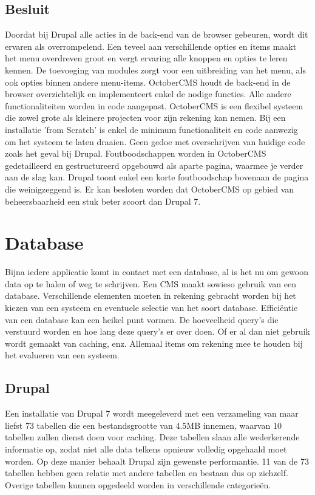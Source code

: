 \subsection{Besluit}
Doordat bij Drupal alle acties in de back-end van de browser gebeuren, wordt dit ervaren als overrompelend. Een teveel aan verschillende opties en items maakt het menu overdreven groot en vergt ervaring alle knoppen en opties te leren kennen. De toevoeging van modules zorgt voor een uitbreiding van het menu, als ook opties binnen andere menu-items. OctoberCMS houdt de back-end in de browser overzichtelijk en implementeert enkel de nodige functies. Alle andere functionaliteiten worden in code aangepast.
\newline\newline
OctoberCMS is een flexibel systeem die zowel grote als kleinere projecten voor zijn rekening kan nemen. Bij een installatie 'from Scratch' is enkel de minimum functionaliteit en code aanwezig om het systeem te laten draaien. Geen gedoe met overschrijven van huidige code zoals het geval bij Drupal.
\newline\newline
Foutboodschappen worden in OctoberCMS gedetailleerd en gestructureerd opgebouwd als aparte pagina, waarmee je verder aan de slag kan. Drupal toont enkel een korte foutboodschap bovenaan de pagina die weinigzeggend is.
\newline\newline
Er kan besloten worden dat OctoberCMS op gebied van beheersbaarheid een stuk beter scoort dan Drupal 7.


\section{Database}
Bijna iedere applicatie komt in contact met een database, al is het nu om gewoon data op te halen of weg te schrijven. Een CMS maakt sowieso gebruik van een database. Verschillende elementen moeten in rekening gebracht worden bij het kiezen van een systeem en eventuele selectie van het soort database. Efficiëntie van een database kan een heikel punt vormen. De hoeveelheid query's die verstuurd worden en hoe lang deze query's er over doen. Of er al dan niet gebruik wordt gemaakt van caching, enz. Allemaal items om rekening mee te houden bij het evalueren van een systeem.

\subsection{Drupal}
Een installatie van Drupal 7 wordt meegeleverd met een verzameling van maar liefst 73 tabellen die een bestandsgrootte van 4.5MB innemen, waarvan 10 tabellen zullen dienst doen voor caching. Deze tabellen slaan alle wederkerende informatie op, zodat niet alle data telkens opnieuw volledig opgehaald moet worden. Op deze manier behaalt Drupal zijn gewenste performantie. 11 van de 73 tabellen hebben geen relatie met andere tabellen en bestaan dus op zichzelf. Overige tabellen kunnen opgedeeld worden in verschillende categorieën. 

